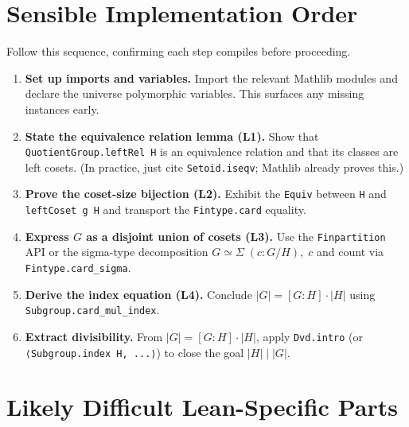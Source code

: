 \documentclass[11pt, a4paper]{article}
\theoremstyle{plain}
\theoremstyle{definition}
\newcommand{\abs}[1]{\lvert #1 \rvert}
\newcommand{\divides}{\mid}
\newcommand{\lean}[1]{\texttt{\color{lean-blue}#1}}
\begin{document}
\section{Sensible Implementation Order}
\label{sec:order}

Follow this sequence, confirming each step compiles before proceeding.

\begin{enumerate}[label=\textbf{Step~\arabic*.}, leftmargin=*, widest=Step~6]

  \item \textbf{Set up imports and variables.}
    Import the relevant Mathlib modules and declare the universe
    polymorphic variables. This surfaces any missing instances early.

  \item \textbf{State the equivalence relation lemma (L1).}
    Show that \lean{QuotientGroup.leftRel H} is an equivalence relation
    and that its classes are left cosets. (In practice, just cite
    \lean{Setoid.iseqv}; Mathlib already proves this.)

  \item \textbf{Prove the coset-size bijection (L2).}
    Exhibit the \lean{Equiv} between \lean{H} and \lean{leftCoset g H} and
    transport the \lean{Fintype.card} equality.

  \item \textbf{Express $G$ as a disjoint union of cosets (L3).}
    Use the \lean{Finpartition} API or the sigma-type decomposition
    $G \simeq \Sigma\; (c : G/H),\; c$ and count via
    \lean{Fintype.card\_sigma}.

  \item \textbf{Derive the index equation (L4).}
    Conclude $\abs{G} = [G:H] \cdot \abs{H}$ using
    \lean{Subgroup.card\_mul\_index}.

  \item \textbf{Extract divisibility.}
    From $\abs{G} = [G:H] \cdot \abs{H}$, apply
    \lean{Dvd.intro} (or \lean{⟨Subgroup.index H, ...⟩}) to close the
    goal $\abs{H} \divides \abs{G}$.

\end{enumerate}

\section{Likely Difficult Lean-Specific Parts}
\label{sec:difficulties}
\end{document}
